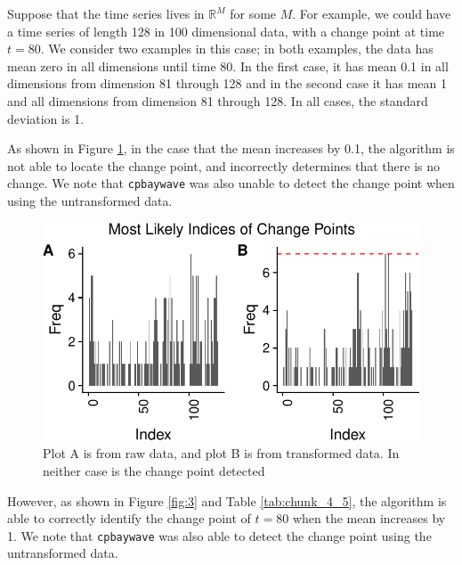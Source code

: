 \documentclass[smallextended]{svjour3}       %
\begin{document}
\begin{example}\label{ex:1} Suppose that the time series lives in
\(\mathbb {R}^M\) for some \(M\). For example, we could have a time
series of length 128 in 100 dimensional data, with a change point at
time \(t = 80\). We consider two examples in this case; in both
examples, the data has mean zero in all dimensions until time 80. In the
first case, it has mean 0.1 in all dimensions from dimension 81 through
128 and in the second case it has mean 1 and all dimensions from
dimension 81 through 128. In all cases, the standard deviation is 1.

As shown in Figure \ref{fig:2}, in the case that the mean increases by 0.1, the algorithm is not able to
locate the change point, and incorrectly determines that there is no change. We note that \texttt{cpbaywave} was also unable to detect the change point when using the untransformed data.

\begin{figure}[h!]\includegraphics{springer_template_files/figure-latex/chunk_3-1}
\caption{Plot A is from raw data, and plot B is from transformed data. In neither case is the change point detected}
 \label{fig:2}\end{figure}

However, as shown in Figure \ref{fig:3} and Table \ref{tab:chunk_4_5}, the algorithm is able to correctly identify the change point of $t = 80$ when the mean increases by 1. We note that \texttt{cpbaywave} was also able to detect the change point using the untransformed data.



\end{example}
\end{document}

